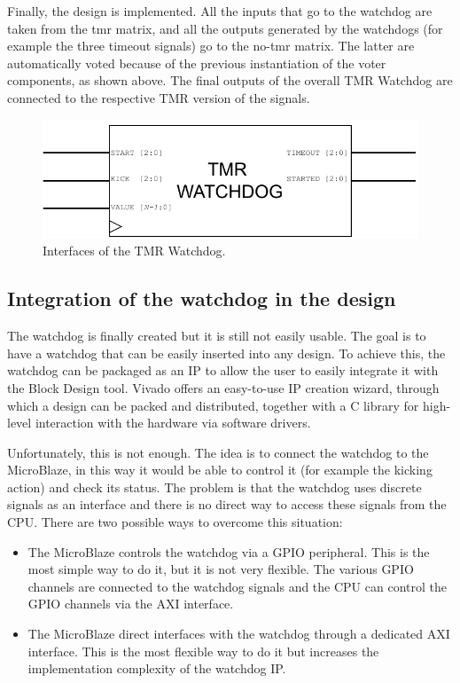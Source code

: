 Finally, the design is implemented. All the inputs that go to the watchdog are taken from the tmr matrix, and all the outputs generated by the watchdogs (for example the three timeout signals) go to the no-tmr matrix. The latter are automatically voted because of the previous instantiation of the voter components, as shown above. The final outputs of the overall TMR Watchdog are connected to the respective TMR version of the signals.

\begin{figure}[H]
\centering
\includegraphics[width=0.7\linewidth]{images/chapter4/wd_tmr.pdf}
\caption{Interfaces of the TMR Watchdog.}
\label{fig:wd_tmr}
\end{figure}


\subsection{Integration of the watchdog in the design}

The watchdog is finally created but it is still not easily usable. The goal is to have a watchdog that can be easily inserted into any design. To achieve this, the watchdog can be packaged as an IP to allow the user to easily integrate it with the Block Design tool. Vivado offers an easy-to-use IP creation wizard, through which a design can be packed and distributed, together with a C library for high-level interaction with the hardware via software drivers.\bigskip

Unfortunately, this is not enough. The idea is to connect the watchdog to the MicroBlaze, in this way it would be able to control it (for example the kicking action) and check its status. The problem is that the watchdog uses discrete signals as an interface and there is no direct way to access these signals from the CPU. There are two possible ways to overcome this situation:

\begin{itemize}
    \item The MicroBlaze controls the watchdog via a GPIO peripheral. This is the most simple way to do it, but it is not very flexible. The various GPIO channels are connected to the watchdog signals and the CPU can control the GPIO channels via the AXI interface.
    \item The MicroBlaze direct interfaces with the watchdog through a dedicated AXI interface. This is the most flexible way to do it but increases the implementation complexity of the watchdog IP.
\end{itemize}


